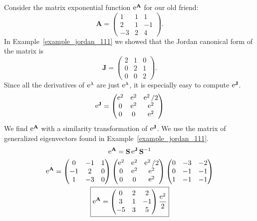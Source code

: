 \begin{Example}
  \label{example_eAt_111}
  Consider the matrix exponential function $\mathop{\mathrm{e}}\nolimits^{\mathbf{A}}$ for our old friend:
  \[
  \mathbf{A} = 
  \begin{pmatrix}
    1 & 1 & 1 \\
    2 & 1 & -1 \\
    -3 & 2 & 4 
  \end{pmatrix}.
  \]
  In Example~\ref{example_jordan_111} we showed that the Jordan canonical
  form of the matrix is
  \[
  \mathbf{J} = 
  \begin{pmatrix}
    2 & 1 & 0 \\
    0 & 2 & 1 \\
    0 & 0 & 2 
  \end{pmatrix}.
  \]
  Since all the derivatives of $\mathop{\mathrm{e}}\nolimits^\lambda$ are just $\mathop{\mathrm{e}}\nolimits^\lambda$, 
  it is especially easy to compute $\mathop{\mathrm{e}}\nolimits^{\mathbf{J}}$.
  \[
  \mathop{\mathrm{e}}\nolimits^{\mathbf{J}} = 
  \begin{pmatrix}
    \mathop{\mathrm{e}}\nolimits^2 & \mathop{\mathrm{e}}\nolimits^2 & \mathop{\mathrm{e}}\nolimits^2/2 \\
    0 & \mathop{\mathrm{e}}\nolimits^2 & \mathop{\mathrm{e}}\nolimits^2 \\
    0 & 0 & \mathop{\mathrm{e}}\nolimits^2 
  \end{pmatrix}
  \]
  We find $\mathop{\mathrm{e}}\nolimits^{\mathbf{A}}$ with a similarity transformation of $\mathop{\mathrm{e}}\nolimits^{\mathbf{J}}$.
  We use the matrix of generalized eigenvectors found in 
  Example~\ref{example_jordan_111}.
  \begin{gather*}
    \mathop{\mathrm{e}}\nolimits^{\mathbf{A}} = \mathbf{S} \mathop{\mathrm{e}}\nolimits^{\mathbf{J}} \mathbf{S}^{-1} \\
    \mathop{\mathrm{e}}\nolimits^{\mathbf{A}} =     \begin{pmatrix}
      0 & -1 & 1 \\
      -1 & 2 & 0 \\
      1 & -3 & 0 
    \end{pmatrix} 
    \begin{pmatrix}
      \mathop{\mathrm{e}}\nolimits^2 & \mathop{\mathrm{e}}\nolimits^2 & \mathop{\mathrm{e}}\nolimits^2/2 \\
      0 & \mathop{\mathrm{e}}\nolimits^2 & \mathop{\mathrm{e}}\nolimits^2 \\
      0 & 0 & \mathop{\mathrm{e}}\nolimits^2 
    \end{pmatrix}
    \begin{pmatrix}
      0 & -3 & -2 \\
      0 & -1 & -1 \\
      1 & -1 & -1 
    \end{pmatrix} \\
    \boxed{
      \mathop{\mathrm{e}}\nolimits^{\mathbf{A}} =     \begin{pmatrix}
        0 & 2 & 2 \\
        3 & 1 & -1 \\
        -5 & 3 & 5
      \end{pmatrix} \frac{\mathop{\mathrm{e}}\nolimits^2}{2}
      }
  \end{gather*}
\end{Example}










